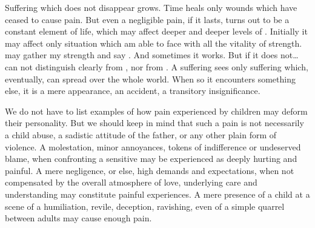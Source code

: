 Suffering which does not disappear grows.  Time heals only wounds which have
ceased to cause pain.  But even a negligible pain, if it lasts, turns out to be
a constant element of  life, which may affect deeper and deeper levels of
.  Initially it may affect only  situation which
 am able to face with all the vitality of  strength. 
may gather my strength and say . And sometimes
it works.  But if it does not\ldots {} can not distinguish clearly  from , nor  from . A suffering
 sees only suffering which, eventually, can spread over the whole world.
When so it encounters something else, it is a mere appearance, an accident, a
transitory insignificance.

\pa We do not have to list examples of how pain experienced by children may
deform their personality.  But we should keep in mind that such a pain is not
necessarily a child abuse, a sadistic attitude of the father, or any other plain
form of violence.  A molestation, minor annoyances, tokens of indifference or
undeserved blame, when confronting a sensitive  may be experienced as
deeply hurting and painful.  A mere negligence, or else, high demands and
expectations, when not compensated by the overall atmosphere of love, underlying
care and understanding may constitute painful experiences. A mere presence of a
child at a scene of a humiliation, revile, deception, ravishing, even of a
simple quarrel between adults may cause enough pain. 


